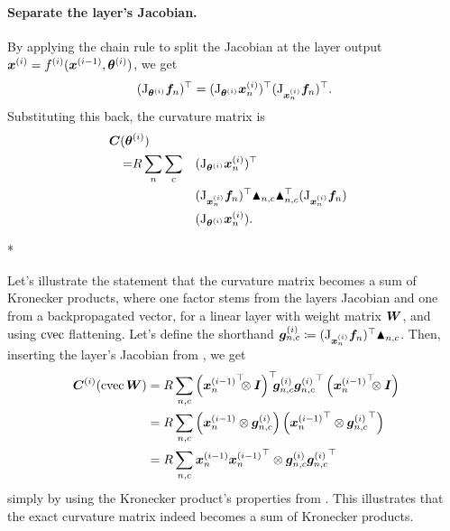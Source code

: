 \paragraph{Separate the layer's Jacobian.}
By applying the chain rule to split the Jacobian at the layer output ${\bm{x}}^{(i)} = f^{(i)}({\bm{x}}^{(i-1)}, {\bm{\theta}}^{(i)})$, we get
\begin{align*}
  (\mathrm{J}_{{\bm{\theta}}^{(i)}} {\bm{f}}_n)^{\top}
  =
  (\mathrm{J}_{{\bm{\theta}}^{(i)}} {\bm{x}}^{(i)}_n)^{\top}
  (\mathrm{J}_{{\bm{x}}_n^{(i)}} {\bm{f}}_n)^{\top}.
\end{align*}
Substituting this back, the curvature matrix is
\begin{align*}
  {\bm{C}}({\bm{\theta}}&^{(i)}) \\ =& R \sum_n \sum_{c}
                          &&(\mathrm{J}_{{\bm{\theta}}^{(i)}} {\bm{x}}^{(i)}_n)^{\top} \\
             & &&(\mathrm{J}_{{\bm{x}}_n^{(i)}} {\bm{f}}_n)^{\top}
                  \blacktriangle_{n,c}
                  \blacktriangle_{n,c}^{\top}
                  (\mathrm{J}_{{\bm{x}}_n^{(i)}} {\bm{f}}_n) \\
             & &&(\mathrm{J}_{{\bm{\theta}}^{(i)}} {\bm{x}}^{(i)}_n).
\end{align*}

\switchcolumn[1]*
\begin{example}\label{ex:curvature-matrix-sum-of-kronecker-products}
  Let's illustrate the statement that the curvature matrix becomes a sum of Kronecker products, where one factor stems from the layers Jacobian and one from a backpropagated vector, for a linear layer with weight matrix ${\bm{W}}$, and using $\operatorname{cvec}$ flattening.
  Let's define the shorthand ${\bm{g}}_{n,c}^{{(i)}} \coloneqq (\mathrm{J}_{{\bm{x}}_n^{(i)}} {\bm{f}}_n)^{\top} \blacktriangle_{n,c}$.
  Then, inserting the layer's Jacobian from , we get
  \begin{align*}
      \mC^{(i)}(\cvec \mW)
      &=
      R \sum_{n,c}
      \left(
      {\vx_n^{(i-1)}}^{\top}\!\!\! \otimes \mI
      \right)^\top
      \!\!\!\vg_{n,c}^{(i)}
      {\vg_{n,c}^{(i)}}^\top
      \left(
      {\vx_n^{(i-1)}}^{\top} \!\!\!\otimes \mI
      \right)\!\!
      \\
      &=
      R \sum_{n,c}
      \left(
      \vx_n^{(i-1)} \otimes \vg_{n,c}^{(i)}
      \right)
      \left(
      {\vx_n^{(i-1)}}^\top \otimes {\vg_{n,c}^{(i)}}^\top
      \right)
      \\
      &=
      R \sum_{n,c}
      \vx_n^{(i-1)} {\vx_n^{(i-1)}}^\top
      \otimes
      \vg_{n,c}^{(i)} {\vg_{n,c}^{(i)}}^\top\,
  \end{align*}
  simply by using the Kronecker product's properties from .
  This illustrates that the exact curvature matrix indeed becomes a sum of Kronecker products.
\end{example}
\switchcolumn[0]

